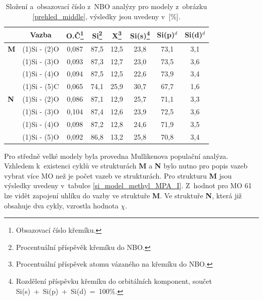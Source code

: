 \documentclass[
digital, %
table,   %
lof,     %
lot,     %
oneside,
]{fithesis3}
\begin{document}
\begin{table}[H]
\begin{minipage}{\textwidth}
\caption{Složení a~obsazovací číslo z~NBO analýzy pro modely z~obrázku \ref{prehled_middle}, výsledky jsou uvedeny v~[\%].}
\begin{tabular}{|l|c|c|c|c|c|c|c|}
\hline
\label{nbo_middle} &  Vazba & O.Č\footnote{Obsazovací číslo křemíku.} & Si\footnote{Procentuální příspěvěk křemíku do NBO.} & X\footnote{Procentuální příspěvek atomu vázaného na křemíku do NBO.} & Si(s)\footnote{Rozdělení příspěvku křemíku do orbitálních komponent, součet Si(s)~+~Si(p)~+~Si(d)~=~100\%.} & Si(p)$^d$ &Si(d)$^d$ \\ \hline
\textbf{M} & (1)Si - (2)O & 0,087 & 87,5  & 12,5  & 23,8  & 73,1  & 3,1  \\ \hline
& (1)Si - (3)O & 0,093 & 87,3  & 12,7  & 23,0  & 73,5  & 3,6  \\ \hline
&(1)Si - (4)O & 0,094 & 87,5  & 12,5  & 22,6  & 73,9  & 3,4  \\ \hline
& (1)Si - (5)C & 0,065 & 74,1  & 25,9  & 30,7  & 67,7  & 1,6  \\ \hline
\textbf{N} & (1)Si - (2)O & 0,086 & 87,1  & 12,9  & 25,7  & 71,1  & 3,3  \\ \hline
& (1)Si - (3)O & 0,104 & 87,4  & 12,6  & 23,9  & 72,5  & 3,6  \\ \hline
& (1)Si - (4)O & 0,098 & 87,2  & 12,8  & 24,6  & 71,9  & 3,5  \\ \hline
& (1)Si - (5)O & 0,092 & 86,8  & 13,2  & 25,8  & 70,8  & 3,4  \\ \hline
\end{tabular}
\end{minipage}
\end{table}


Pro středně velké modely byla provedna Mullikenova populační analýza. Vzhledem k~existenci cyklů ve strukturách \textbf{M} a \textbf{N} bylo nutno pro popis vazeb vybrat více MO než je počet vazeb ve strukturách. Pro strukturu \textbf{M} jsou výsledky uvedeny v~tabulce \ref{si_model_methyl_MPA_I}. Z~hodnot pro MO 61 lze vidět zapojení uhlíku do vazby ve struktuře \textbf{M}. Ve struktuře \textbf{N}, která již obsahuje dva cykly, vzrostla hodnota $\chi$.
\end{document}
